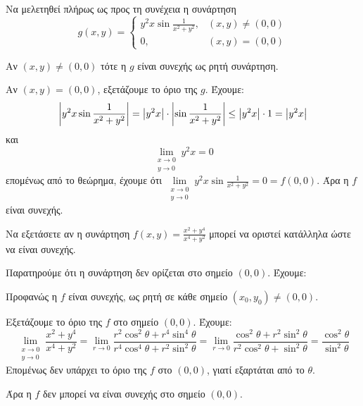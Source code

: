 \begin{example}
  Να μελετηθεί πλήρως ως προς τη συνέχεια η συνάρτηση 
  \[
    g(x,y) = 
    \begin{cases} 
      y^{2}x \sin{\frac{1}{x^{2}+y^{2}}}, & (x,y) 
      \neq (0,0) \\ 0, & (x,y) = (0,0)
    \end{cases}  
  \] 
  \begin{solution}
  \item {}
    Αν $ (x,y) \neq (0,0) $ τότε η $g$ είναι συνεχής 
    ως ρητή συνάρτηση.

    Αν $ (x,y)=(0,0) $, εξετάζουμε το όριο της $g$. 
    Έχουμε:
    \[
      \abs{y^{2}x \sin{\frac{1}{x^{2}+y^{2}}}} = 
      \abs{y^{2}x}\cdot \abs{\sin{\frac{1}{x^{2}+y^{2}}}}
      \leq \abs{y^{2}x} \cdot 1 = \abs{y^{2}x}  
    \] 
    και 
    \[
      \lim\limits_{\substack{x\to 0 \\y \to 0}} y^{2}x = 0 
    \] 
    επομένως από το θεώρημα, έχουμε ότι 
    $ \lim\limits_{\substack{x\to 0 \\y \to 0}} y^{2}x 
    \sin{\frac{1}{x^{2}+y^{2}}} = 0 = f(0,0) $. Άρα η $f$ είναι συνεχής.
  \end{solution}
\end{example}

\begin{example}
  Να εξετάσετε αν η συνάρτηση $ f(x,y) = \frac{x^{2}+y^{4}}{x^{4}+y^{2}} $ μπορεί να 
  οριστεί κατάλληλα ώστε να είναι συνεχής.
  \begin{solution}
    Παρατηρούμε ότι η συνάρτηση δεν ορίζεται στο σημείο $ (0,0) $. Έχουμε:
    \begin{myitemize}
      \item Προφανώς η $f$ είναι συνεχής, ως ρητή σε κάθε σημείο 
        $ (x_{0}, y_{0}) \neq (0,0) $.  
      \item Εξετάζουμε το όριο της $f$ στο σημείο $ (0,0) $. Έχουμε:
        \[
          \lim\limits_{\substack{x\to 0 \\y \to 0}} \frac{x^{2}+y^{4}}{x^{4}+y^{2}} =
          \lim_{r \to 0} \frac{r^{2} \cos^{2}{\theta} + r^{4} 
          \sin^{4}{\theta}}{r^{4} \cos^{4}{\theta} + r^{2} \sin^{2}{\theta}} =
          \lim_{r \to 0} \frac{\cos^{2}{\theta} + r^{2} \sin^{2}{\theta}}{r^{2}
          \cos^{2}{\theta} + \sin^{2}{\theta}} =
          \frac{\cos^{2}{\theta}}{\sin^{2}{\theta}}
        \] 
        Επομένως δεν υπάρχει το όριο της $f$ στο $ (0,0) $, γιατί εξαρτάται από το
        $\theta$. 
    \end{myitemize}
    Άρα η $f$ δεν μπορεί να είναι συνεχής στο σημείο $(0,0)$.
  \end{solution}
\end{example}

